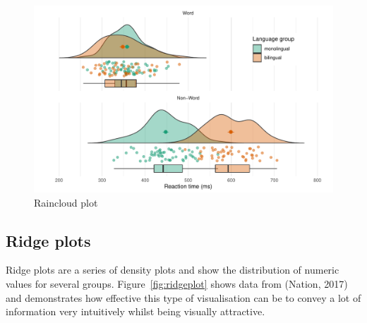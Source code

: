 \documentclass[
  english,
  doc,floatsintext]{apa6}
\begin{document}
\begin{figure}

{\centering \includegraphics[width=1\linewidth]{images/raincloud-1} 

}

\caption{Raincloud plot}\label{fig:raincloud}
\end{figure}

\hypertarget{ridge-plots}{%
\subsection{Ridge plots}\label{ridge-plots}}

Ridge plots are a series of density plots and show the distribution of numeric values for several groups. Figure~\ref{fig:ridgeplot} shows data from (Nation, 2017) and demonstrates how effective this type of visualisation can be to convey a lot of information very intuitively whilst being visually attractive.
\end{document}
